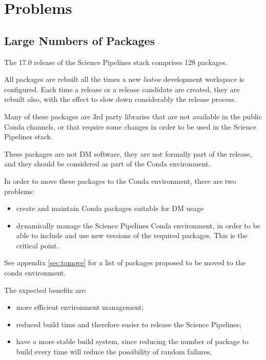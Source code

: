 \newpage
\section{Problems} \label{sec:problems}

\subsection{Large Numbers of Packages} \label{sec:high}

The 17.0 release of the Science Pipelines stack comprises 128 packages.

All packages are rebuilt all the times a new \textit{lsstsw} development workspace is configured. 
Each time a release or a release candidate are created, they are rebuilt also, with the effect to slow down considerably the release process.

Many of these packages are 3rd party libraries that are not available in the public Conda channels, or that require some changes in order to be used in the Science Pipelines stack.

These packages are not DM software, they are not formally part of the release, and they should be considered as part of the Conda environment.

In order to move these packages to the Conda environment, there are two problems:

\begin{itemize}
\item create and maintain Conda packages suitable for DM usage
\item dynamically manage the Science Pipelines Conda environment, in order to be able to include and use new versions of the required packages. This is the critical point.
\end{itemize}

See appendix \ref{sec:tomove} for a list of packages proposed to be moved to the conda environment.

The expected benefits are:

\begin{itemize}
\item more efficient environment management;
\item reduced build time and therefore easier to release the Science Pipelines;
\item have a more stable build system, since reducing the number of package to build every time will reduce the possibility of random failures.
\end{itemize}


